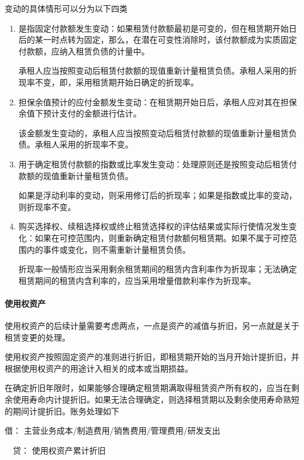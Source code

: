 \documentclass[UTF8,12pt]{ctexart}
\newenvironment{Dr}{\noindent 借：}{\par}
\newenvironment{Cr}{\noindent \ \ 贷：}{\par}
\numberwithin{equation}{section} %
\numberwithin{figure}{section}
\numberwithin{table}{section}
\begin{document}
	变动的具体情形可以分为以下四类
	\begin{enumerate}
		\item 是指固定付款额发生变动：如果租赁付款额最初是可变的，但在租赁期开始日后的某一时点转为固定，那么，在潜在可变性消除时，该付款额成为实质固定付款额，应纳入租赁负债的计量中。
		
		承租人应当按照变动后租赁付款额的现值重新计量租赁负债。承租人采用的折现率不变，即，采用租赁期开始日确定的折现率。
		
		\item 担保余值预计的应付金额发生变动：在租赁期开始日后，承租人应对其在担保余值下预计支付的金额进行估计。
		
		该金额发生变动的，承租人应当按照变动后租赁付款额的现值重新计量租赁负债。承租人采用的折现率不变。
		
		\item 用于确定租赁付款额的指数或比率发生变动：处理原则还是按照变动后租赁付款额的现值重新计量租赁负债。
		
		如果是浮动利率的变动，则采用修订后的折现率；如果是指数或比率的变动，则折现率不变。
		
		\item 购买选择权、续租选择权或终止租赁选择权的评估结果或实际行使情况发生变化：如果在可控范围内，则重新确定租赁付款额何租赁期。如果不属于可控范围内的事件或变化，则不需重新计量租赁负债。
		
		折现率一般情形应当采用剩余租赁期间的租赁内含利率作为折现率；无法确定租赁期间的租赁内含利率的，应当采用增量借款利率作为折现率。
	\end{enumerate}
	
	\paragraph{使用权资产}
	使用权资产的后续计量需要考虑两点，一点是资产的减值与折旧，另一点就是关于租赁变更的处理。
	
	使用权资产按照固定资产的准则进行折旧，即租赁期开始的当月开始计提折旧，并根据使用权资产的用途计入相关的成本或当期损益。
	
	在确定折旧年限时，如果能够合理确定租赁期满取得租赁资产所有权的，应当在剩余使用寿命内计提折旧。如果无法合理确定，则选择租赁期以及剩余使用寿命熟短的期间计提折旧。账务处理如下
	
	\begin{Dr}
		主营业务成本/制造费用/销售费用/管理费用/研发支出
	\end{Dr}
	\begin{Cr}
		使用权资产累计折旧
	\end{Cr}
\end{document}
